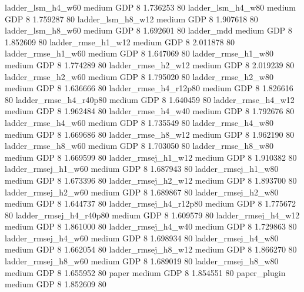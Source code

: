      ladder_lsm_h4_w60     medium      GDP                 8 1.736253 80
     ladder_lsm_h4_w80     medium      GDP                 8 1.759287 80
     ladder_lsm_h8_w12     medium      GDP                 8 1.907618 80
     ladder_lsm_h8_w60     medium      GDP                 8 1.692601 80
            ladder_mdd     medium      GDP                 8 1.852609 80
    ladder_rmse_h1_w12     medium      GDP                 8 2.011878 80
    ladder_rmse_h1_w60     medium      GDP                 8 1.647069 80
    ladder_rmse_h1_w80     medium      GDP                 8 1.774289 80
    ladder_rmse_h2_w12     medium      GDP                 8 2.019239 80
    ladder_rmse_h2_w60     medium      GDP                 8 1.795020 80
    ladder_rmse_h2_w80     medium      GDP                 8 1.636666 80
 ladder_rmse_h4_r12p80     medium      GDP                 8 1.826616 80
 ladder_rmse_h4_r40p80     medium      GDP                 8 1.640459 80
    ladder_rmse_h4_w12     medium      GDP                 8 1.962484 80
    ladder_rmse_h4_w40     medium      GDP                 8 1.792676 80
    ladder_rmse_h4_w60     medium      GDP                 8 1.735549 80
    ladder_rmse_h4_w80     medium      GDP                 8 1.669686 80
    ladder_rmse_h8_w12     medium      GDP                 8 1.962190 80
    ladder_rmse_h8_w60     medium      GDP                 8 1.703050 80
    ladder_rmse_h8_w80     medium      GDP                 8 1.669599 80
   ladder_rmsej_h1_w12     medium      GDP                 8 1.910382 80
   ladder_rmsej_h1_w60     medium      GDP                 8 1.687943 80
   ladder_rmsej_h1_w80     medium      GDP                 8 1.673396 80
   ladder_rmsej_h2_w12     medium      GDP                 8 1.893700 80
   ladder_rmsej_h2_w60     medium      GDP                 8 1.689867 80
   ladder_rmsej_h2_w80     medium      GDP                 8 1.644737 80
ladder_rmsej_h4_r12p80     medium      GDP                 8 1.775672 80
ladder_rmsej_h4_r40p80     medium      GDP                 8 1.609579 80
   ladder_rmsej_h4_w12     medium      GDP                 8 1.861000 80
   ladder_rmsej_h4_w40     medium      GDP                 8 1.729863 80
   ladder_rmsej_h4_w60     medium      GDP                 8 1.698934 80
   ladder_rmsej_h4_w80     medium      GDP                 8 1.662054 80
   ladder_rmsej_h8_w12     medium      GDP                 8 1.866270 80
   ladder_rmsej_h8_w60     medium      GDP                 8 1.689019 80
   ladder_rmsej_h8_w80     medium      GDP                 8 1.655952 80
                 paper     medium      GDP                 8 1.854551 80
          paper_plugin     medium      GDP                 8 1.852609 80